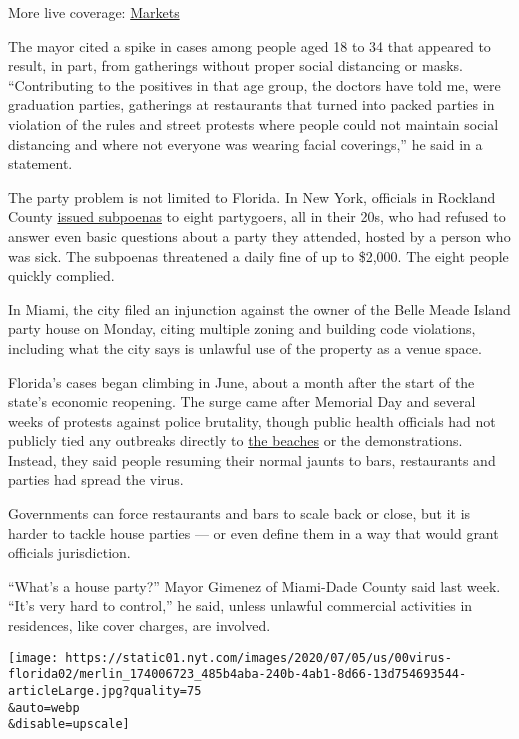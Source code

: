 More live coverage:
\href{https://www.nytimes.com/live/2020/08/04/business/stock-market-today-coronavirus?action=click\&pgtype=Article\&state=default\&region=MAIN_CONTENT_1\&context=storylines_live_updates}{Markets}

The mayor cited a spike in cases among people aged 18 to 34 that
appeared to result, in part, from gatherings without proper social
distancing or masks. ``Contributing to the positives in that age group,
the doctors have told me, were graduation parties, gatherings at
restaurants that turned into packed parties in violation of the rules
and street protests where people could not maintain social distancing
and where not everyone was wearing facial coverings,'' he said in a
statement.

The party problem is not limited to Florida. In New York, officials in
Rockland County
\href{https://www.nytimes.com/2020/07/01/nyregion/rockland-coronavirus-party.html}{issued
subpoenas} to eight partygoers, all in their 20s, who had refused to
answer even basic questions about a party they attended, hosted by a
person who was sick. The subpoenas threatened a daily fine of up to
\$2,000. The eight people quickly complied.

In Miami, the city filed an injunction against the owner of the Belle
Meade Island party house on Monday, citing multiple zoning and building
code violations, including what the city says is unlawful use of the
property as a venue space.

Florida's cases began climbing in June, about a month after the start of
the state's economic reopening. The surge came after Memorial Day and
several weeks of protests against police brutality, though public health
officials had not publicly tied any outbreaks directly to
\href{https://www.nytimes.com/2020/04/30/us/newsom-beaches-california-coronavirus.html}{the
beaches} or the demonstrations. Instead, they said people resuming their
normal jaunts to bars, restaurants and parties had spread the virus.

Governments can force restaurants and bars to scale back or close, but
it is harder to tackle house parties --- or even define them in a way
that would grant officials jurisdiction.

``What's a house party?'' Mayor Gimenez of Miami-Dade County said last
week. ``It's very hard to control,'' he said, unless unlawful commercial
activities in residences, like cover charges, are involved.

\texttt{[image: https://static01.nyt.com/images/2020/07/05/us/00virus-florida02/merlin\_174006723\_485b4aba-240b-4ab1-8d66-13d754693544-articleLarge.jpg?quality=75\\\&auto=webp\\\&disable=upscale]}

